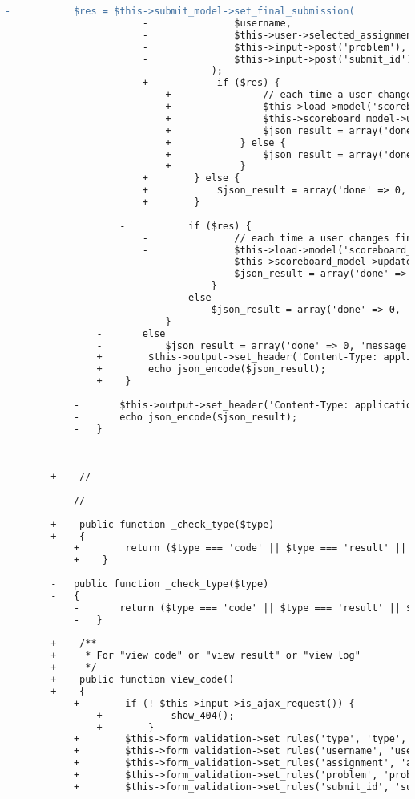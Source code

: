\begin{lstlisting}[language=diff, caption=Perubahan pada kode Submissions.php]
						-			$res = $this->submit_model->set_final_submission(
						-				$username,
						-				$this->user->selected_assignment['id'],
						-				$this->input->post('problem'),
						-				$this->input->post('submit_id')
						-			);
						+            if ($res) {
							+                // each time a user changes final submission, we should update scoreboard of that assignment
							+                $this->load->model('scoreboard_model');
							+                $this->scoreboard_model->update_scoreboard($this->user->selected_assignment['id']);
							+                $json_result = array('done' => 1);
							+            } else {
							+                $json_result = array('done' => 0, 'message' => 'Selecting Final Submission Failed');
							+            }
						+        } else {
						+            $json_result = array('done' => 0, 'message' => 'Input Error');
						+        }
					
					-			if ($res) {
						-				// each time a user changes final submission, we should update scoreboard of that assignment
						-				$this->load->model('scoreboard_model');
						-				$this->scoreboard_model->update_scoreboard($this->user->selected_assignment['id']);
						-				$json_result = array('done' => 1);
						-			}
					-			else
					-				$json_result = array('done' => 0, 'message' => 'Selecting Final Submission Failed');
					-		}
				-		else
				-			$json_result = array('done' => 0, 'message' => 'Input Error');
				+        $this->output->set_header('Content-Type: application/json; charset=utf-8');
				+        echo json_encode($json_result);
				+    }
			
			-		$this->output->set_header('Content-Type: application/json; charset=utf-8');
			-		echo json_encode($json_result);
			-	}
		
		
		
		+    // ------------------------------------------------------------------------
		
		-	// ------------------------------------------------------------------------
		
		+    public function _check_type($type)
		+    {
			+        return ($type === 'code' || $type === 'result' || $type === 'log');
			+    }
		
		-	public function _check_type($type)
		-	{
			-		return ($type === 'code' || $type === 'result' || $type === 'log');
			-	}
		
		+    /**
		+     * For "view code" or "view result" or "view log"
		+     */
		+    public function view_code()
		+    {
			+        if (! $this->input->is_ajax_request()) {
				+            show_404();
				+        }
			+        $this->form_validation->set_rules('type', 'type', 'callback__check_type');
			+        $this->form_validation->set_rules('username', 'username', 'required|min_length[3]|max_length[20]|alpha_numeric');
			+        $this->form_validation->set_rules('assignment', 'assignment', 'integer|greater_than[0]');
			+        $this->form_validation->set_rules('problem', 'problem', 'integer|greater_than[0]');
			+        $this->form_validation->set_rules('submit_id', 'submit_id', 'integer|greater_than[0]');
			

\end{lstlisting}

